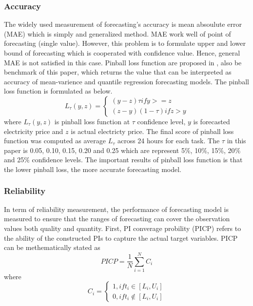 \documentclass[review]{elsarticle}
\begin{document}
    \subsubsection{Accuracy}
      The widely used measurement of forecasting's accuracy is mean absoulute error (MAE) which is simply and generalized method. MAE work well of point of forecasting (single value). However, this problem is to formulate upper and lower bound of forecasting which is cooperated with confidence value. Hence, general MAE is not satisfied in this case.
      Pinball loss function are proposed in \cite{Maciejowska2016}, also be benchmark of this paper, which returns the value that can be interpreted as accuracy of mean-varience and quantile regression forecasting models. The pinball loss function is formulated as below.
      \begin{equation}
        L_{\tau}(y,z) =
        \begin{cases}
          (y-z)\tau if y>=z \\
          (z-y)(1-\tau) if z>y
        \end{cases}
        \label{eq.pinball}
      \end{equation}
      where $L_{\tau}(y,z)$ is pinball loss function at $\tau$ confidence level, $y$ is forecasted electricity price and $z$ is actual electricty price. The final score of pinball loss function was computed as average $L_{\tau}$ across 24 hours for each task. The $\tau$ in this paper is 0.05, 0.10, 0.15, 0.20 and 0.25 which are represent 5$\%$, 10$\%$, 15$\%$, 20$\%$ and 25$\%$ confidence levels.
      The important results of pinball loss function is that the lower pinball loss, the more accurate forecasting model.

    \subsubsection{Reliability}
      In term of reliability measurement, the performance of forecasting model is measured to ensure that the ranges of forecasting can cover the observation values both quality and quantity.
      First,  PI converage probility (PICP) refers to the ability of the constructed PIs to capture the actual target variables. PICP can be methematically stated as
      \begin{equation}
        PICP = \frac{1}{N} \sum_{i=1}^{N} C_{i}
        \label{eq.PICP}
      \end{equation}
      where
      \begin{equation}
        C_{i} =
        \begin{cases}
          1, if t_{i} \in [L_{i},U_{i}] \\
          0, if t_{i} \not\in [L_{i},U_{i}]
        \end{cases}
        \label{eq.Ci}
      \end{equation}
\end{document}
